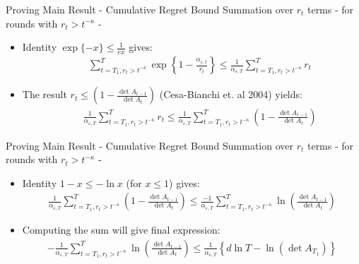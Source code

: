 \documentclass{beamer}
\begin{document}
\begin{frame}{Proving Main Result - Cumulative Regret Bound}
Summation over $r_t$ terms - for rounds with $r_t> t^{-\kappa}$ - \newline
\begin{itemize}
\item Identity $\exp\{-x\}\leq\frac{1}{ex}$ gives:
\begin{eqnarray*}
&&\sum\limits_{t=T_1,r_t> t^{-\kappa}}^{T}\exp\left\{1-\frac{\alpha_{\varepsilon,t}}{r_t}\right\}\leq \frac{1}{\alpha_{\varepsilon,T}}\sum\limits_{t=T_1,r_t> t^{-\kappa}}^{T}r_t\nonumber
\end{eqnarray*}
\item The result $ r_t\leq\left(1-\frac{\det{A_{t-1}}}{\det{A_t}}\right)$ (Cesa-Bianchi et. al 2004) yields:
\begin{eqnarray*}
&&\frac{1}{\alpha_{\varepsilon,T}}\sum\limits_{t=T_1,r_t> t^{-\kappa}}^{T}r_t\leq\frac{1}{\alpha_{\varepsilon,T}}\sum\limits_{t=T_1,r_t> t^{-\kappa}}^{T}\left(1-\frac{\det{A_{t-1}}}{\det{A_t}}\right)\nonumber
\end{eqnarray*}
\end{itemize}
\end{frame}

\begin{frame}{Proving Main Result - Cumulative Regret Bound}
Summation over $r_t$ terms - for rounds with $r_t> t^{-\kappa}$ - \newline
\begin{itemize}
\item Identity $1-x\leq -\ln{x}$ (for $x\leq1$) gives:
\begin{eqnarray*}
\frac{1}{\alpha_{\varepsilon,T}}\sum\limits_{t=T_1,r_t> t^{-\kappa}}^{T}\left(1-\frac{\det{A_{t-1}}}{\det{A_t}}\right)\leq \frac{-1}{\alpha_{\varepsilon,T}}\sum\limits_{t=T_1,r_t> t^{-\kappa}}^{T}\ln{\left(\frac{\det{A_{t-1}}}{\det{A_t}}\right)}
\end{eqnarray*}
\item Computing the sum will give final expression:
\begin{eqnarray*}
 -\frac{1}{\alpha_{\varepsilon,T}}\sum\limits_{t=T_1,r_t> t^{-\kappa}}^{T}\ln{\left(\frac{\det{A_{t-1}}}{\det{A_t}}\right)}\leq \frac{1}{\alpha_{\varepsilon,T}}\left\{d\ln{T}- \ln\left(\det{A_{T_1}}\right)\right\}
\end{eqnarray*}
\end{itemize}
\end{frame}
\end{document}
